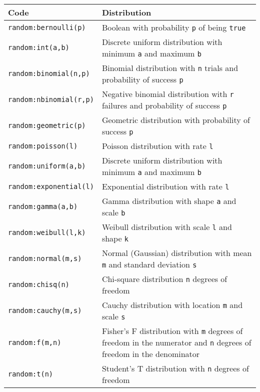 \documentclass[10pt]{article}
\newcommand{\code}[1]{{\tt {#1}}}
\begin{document}
\begin{center}
\begin{tabular}{l|p{4in}}
Code & Distribution \\
\hline
\hline \code{random:bernoulli(p)} & Boolean with probability \code{p} of being \code{true} \\

\hline \code{random:int(a,b)} & Discrete uniform distribution with minimum \code{a} and maximum \code{b} \\
\hline \code{random:binomial(n,p)} & Binomial distribution with \code{n} trials and probability of success \code{p} \\
\hline \code{random:nbinomial(r,p)} & Negative binomial distribution with \code{r} failures and probability of success \code{p} \\
\hline \code{random:geometric(p)} & Geometric distribution with probability of success \code{p} \\
\hline \code{random:poisson(l)} & Poisson distribution with rate \code{l} \\

\hline \code{random:uniform(a,b)} & Discrete uniform distribution with minimum \code{a} and maximum \code{b} \\
\hline \code{random:exponential(l)} & Exponential distribution with rate \code{l} \\
\hline \code{random:gamma(a,b)} & Gamma distribution with shape \code{a} and scale \code{b} \\
\hline \code{random:weibull(l,k)} & Weibull distribution with scale \code{l} and shape \code{k} \\
\hline \code{random:normal(m,s)} & Normal (Gaussian) distribution with mean \code{m} and standard deviation \code{s} \\
\hline \code{random:chisq(n)} & Chi-square distribution \code{n} degrees of freedom \\
\hline \code{random:cauchy(m,s)} & Cauchy distribution with location \code{m} and scale \code{s} \\
\hline \code{random:f(m,n)} & Fisher's F distribution with \code{m} degrees of freedom in the numerator and \code{n} degrees of freedom in the denominator \\
\hline \code{random:t(n)} & Student's T distribution with \code{n} degrees of freedom \\

\end{tabular}
\end{center}
\end{document}
